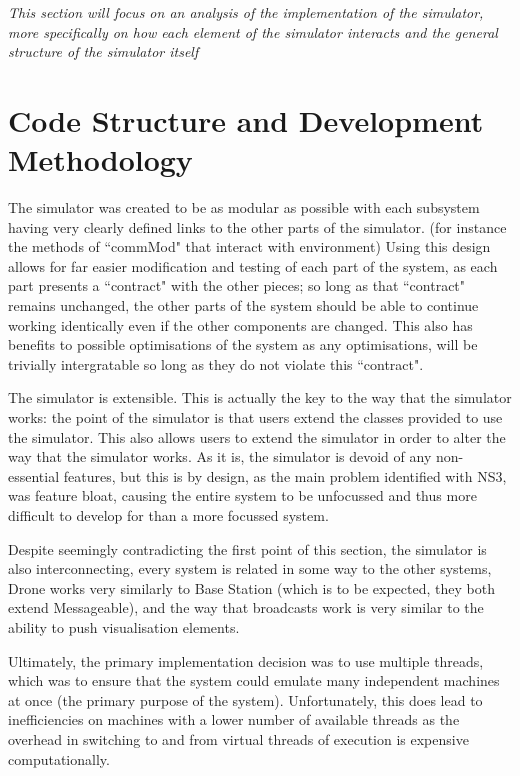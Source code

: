 \emph{This section will focus on an analysis of the implementation of the simulator, more specifically on how each element of the simulator interacts and the general structure of the simulator itself}

\section{Code Structure and Development Methodology}
	The simulator was created to be as modular as possible with each subsystem having very clearly defined
	links to the other parts of the simulator. (for instance the methods of ``commMod" that interact
	with environment) Using this design allows for far easier modification and testing of each part
	of the system, as each part presents a ``contract" with the other pieces; so long as that ``contract"
	remains unchanged, the other parts of the system should be able to continue working identically
	even if the other components are changed. This also has benefits to possible optimisations of the system
	as any optimisations, will be trivially intergratable so long as they do not violate this ``contract".

	The simulator is extensible. This is actually the key to the way that the simulator works: the point
	of the simulator is that users extend the classes provided to use the simulator. This also
	allows users to extend the simulator in order to alter the way that the simulator works. As it is,
	the simulator is devoid of any non-essential features, but this is by design, as the main problem
	identified with NS3, was feature bloat, causing
	the entire system to be unfocussed and thus more difficult to develop for than a more focussed system.

	Despite seemingly contradicting the first point of this section, the simulator is also interconnecting,
	every system is related in some way to the other systems, Drone works very similarly to Base Station
	(which is to be expected, they both extend Messageable), and the way that broadcasts work is very similar
	to the ability to push visualisation elements.

	Ultimately, the primary implementation decision was to use multiple threads, which was to ensure that
	the system could emulate many independent machines at once (the primary purpose of the system).
	Unfortunately, this does lead to inefficiencies on machines with a lower number of available threads as
	the overhead in switching to and from virtual threads of execution is expensive computationally.

